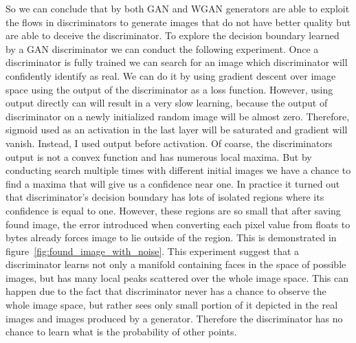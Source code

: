 So we can conclude that by both GAN and WGAN generators are able to exploit the flows in discriminators to generate images that do not have better quality but are able to deceive the discriminator. To explore the decision boundary learned by a GAN discriminator we can conduct the following experiment. Once a discriminator is fully trained we can search for an image which discriminator will confidently identify as real. We can do it by using gradient descent over image space using the output of the discriminator as a loss function. However, using output directly can will result in a very slow learning, because the output of discriminator on a newly initialized random image will be almost zero. Therefore, sigmoid used as an activation in the last layer will be saturated and gradient will vanish. Instead, I used output before activation. Of coarse, the discriminators output is not a convex function and has numerous local maxima. But by conducting search multiple times with different initial images we have a chance to find a maxima that will give us a confidence near one. In practice it turned out that discriminator's decision boundary has lots of isolated regions where its confidence is equal to one. However, these regions are so small that after saving found image, the error introduced when converting each pixel value from floats to bytes already forces image to lie outside of the region. This is demonstrated in figure~\ref{fig:found_image_with_noise}. This experiment suggest that a discriminator learns not only a manifold containing faces in the space of possible images, but has many local peaks scattered over the whole image space. This can happen due to the fact that discriminator never has a chance to observe the whole image space, but rather sees only small portion of it depicted in the real images and images produced by a generator. Therefore the discriminator has no chance to learn what is the probability of other points.  

